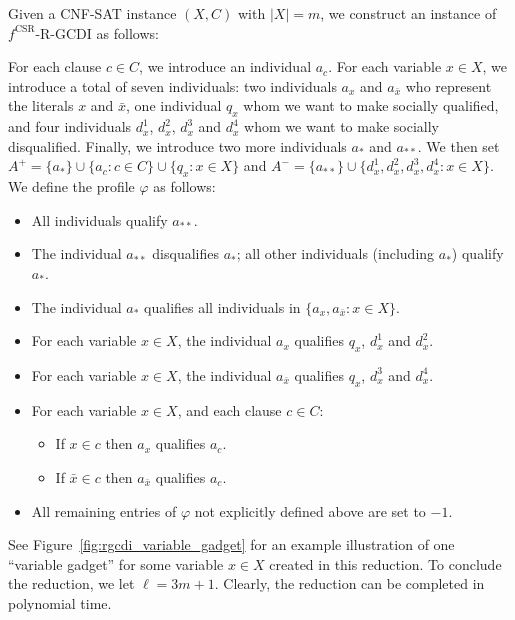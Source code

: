 \documentclass[
    12pt,               %
    a4paper,            %
    bibtotoc,           %
    pointlessnumbers,   %
    ngerman,            %
    titlepage,          %
    leqno,              %
    ]{scrarticle}       %
\newcommand\figref{Figure~\ref}
\begin{document}
\begin{Proof}
Given a CNF-SAT instance $(X, C)$ with $|X|=m$, we construct an instance of $f^{\text{CSR}}$-R-GCDI as follows:

For each clause $c \in C$, we introduce an individual $a_c$. For each variable $x \in X$, we introduce a total of seven individuals: two individuals $a_x$ and $a_{\bar{x}}$ who represent the literals $x$ and $\bar{x}$, one individual $q_x$ whom we want to make socially qualified, and four individuals $d_x^1$, $d_x^2$, $d_x^3$ and $d_x^4$ whom we want to make socially disqualified. Finally, we introduce two more individuals $a_\ast$ and $a_{\ast\ast}$. We then set $A^+ = \{a_\ast\} \cup \{ a_c : c \in C \} \cup \{ q_x : x \in X \}$ and $A^- =  \{a_{\ast\ast}\} \cup \{ d_x^1, d_x^2, d_x^3, d_x^4 : x \in X \}$. We define the profile $\varphi$ as follows:

\begin{itemize}[nolistsep]
\item
All individuals qualify $a_{\ast\ast}$.
\item
The individual $a_{\ast\ast}$ disqualifies $a_\ast$; all other individuals (including $a_\ast$) qualify $a_\ast$.
\item
The individual $a_\ast$ qualifies all individuals in $\{ a_x, a_{\bar{x}} : x \in X \}$.
\item
For each variable $x \in X$, the individual $a_x$ qualifies $q_x$, $d_x^1$ and $d_x^2$.
\item
For each variable $x \in X$, the individual $a_{\bar{x}}$ qualifies $q_x$, $d_x^3$ and $d_x^4$.
\item
For each variable $x \in X$, and each clause $c \in C$:
    \begin{itemize}[nolistsep]
    \item
    If $x \in c$ then $a_x$ qualifies $a_c$.
    \item
    If $\bar{x} \in c$ then $a_{\bar{x}}$ qualifies $a_c$.
    \end{itemize}
\item
All remaining entries of $\varphi$ not explicitly defined above are set to $-1$.
\end{itemize}

See \figref{fig:rgcdi_variable_gadget} for an example illustration of one ``variable gadget'' for some variable $x \in X$ created in this reduction. To conclude the reduction, we let $\ell = 3m+1$. Clearly, the reduction can be completed in polynomial time.




\end{Proof}
\end{document}
